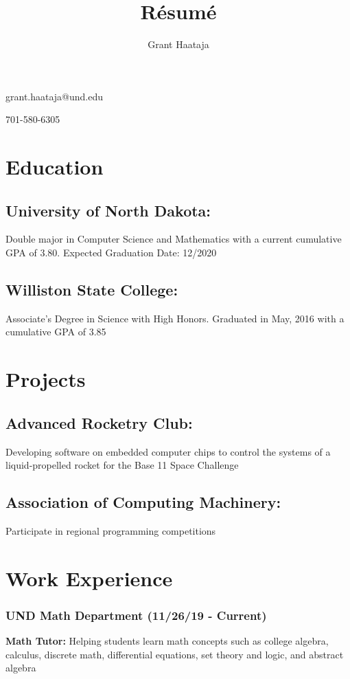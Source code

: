 \documentclass{article}
\makeatletter
\renewcommand{\maketitle}{
\begin{center}
{\huge\bfseries
\theauthor}

\vspace{0.5em}

\large grant.haataja@und.edu

\large 701-580-6305

\end{center}
}
\makeatother
\begin{document}
\title{R\'esum\'e}
\author{Grant Haataja}
\maketitle

\section{Education}

\subsection{University of North Dakota:}
Double major in Computer Science and Mathematics with a current cumulative GPA of 3.80. Expected Graduation Date: 12/2020

\subsection{Williston State College:}
Associate's Degree in Science with High Honors. Graduated in May, 2016 with a cumulative GPA of 3.85

\section{Projects}

\subsection{Advanced Rocketry Club:}
Developing software on embedded computer chips to control the systems of a liquid-propelled rocket for the Base 11 Space Challenge

\subsection{Association of Computing Machinery:}
Participate in regional programming competitions 

\section{Work Experience}

\subsubsection{UND Math Department (11/26/19 - Current)}
\textbf{Math Tutor:} Helping students learn math concepts such as college algebra, calculus, discrete math, differential equations, set theory and logic, and abstract algebra
\end{document}
